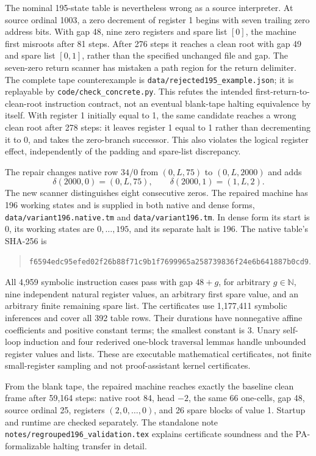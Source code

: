 \documentclass[11pt,letterpaper]{article}
\newcommand{\file}[1]{\texttt{\nolinkurl{#1}}}
\begin{document}
The nominal 195-state table is nevertheless wrong as a source interpreter.
At source ordinal 1003, a zero decrement of register 1 begins with seven
trailing zero address bits. With gap 48, nine zero registers and spare
list $[0]$, the machine first misroots after 81 steps. After 276 steps it
reaches a clean root with gap 49 and spare list $[0,1]$, rather than the
specified unchanged file and gap. The seven-zero return scanner has
mistaken a path region for the return delimiter. The complete tape
counterexample is \file{data/rejected195_example.json}; it is replayable by
\file{code/check_concrete.py}. This refutes the intended first-return-to-clean-root instruction contract,
not an eventual blank-tape halting equivalence by itself. With register 1
initially equal to 1, the same candidate reaches a wrong clean root after
278 steps: it leaves register 1 equal to 1 rather than decrementing it to
0, and takes the zero-branch successor. This also violates the logical
register effect, independently of the padding and spare-list discrepancy.

The repair changes native row $34/0$ from $(0,L,75)$ to $(0,L,2000)$
and adds
\[
 \delta(2000,0)=(0,L,75),\qquad
 \delta(2000,1)=(1,L,2).
\]
The new scanner distinguishes eight consecutive zeros. The repaired
machine has 196 working states and is supplied in both native and dense
forms, \file{data/variant196.native.tm} and \file{data/variant196.tm}.
In dense form its start is 0, its working states are $0,\ldots,195$,
and its separate halt is 196. The native table's SHA-256 is
\begin{quote}\small
\nolinkurl{f6594edc95efed02f26b88f71c9b1f7699965a258739836f24e6b641887b0cd9}.
\end{quote}

All 4,959 symbolic instruction cases pass with gap $48+g$, for arbitrary
$g\in\mathbb N$, nine independent natural register values, an arbitrary
first spare value, and an arbitrary finite remaining spare list. The
certificates use 1,177,411 symbolic inferences and cover all 392 table
rows. Their durations have nonnegative affine coefficients and positive
constant terms; the smallest constant is 3. Unary self-loop induction
and four rederived one-block traversal lemmas handle unbounded register
values and lists. These are executable mathematical certificates, not
finite small-register sampling and not proof-assistant kernel certificates.

From the blank tape, the repaired machine reaches exactly the baseline
clean frame after 59,164 steps: native root 84, head $-2$, the same 66
one-cells, gap 48, source ordinal 25, registers $(2,0,\ldots,0)$, and 26
spare blocks of value 1. Startup and runtime are checked separately.
The standalone note \file{notes/regrouped196_validation.tex} explains
certificate soundness and the PA-formalizable halting transfer in detail.
\end{document}
